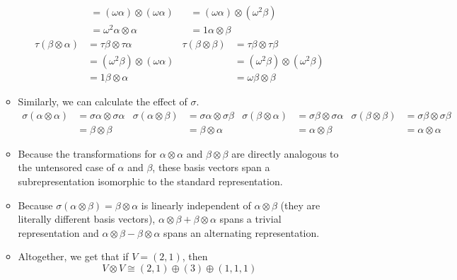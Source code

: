 \documentclass[../notes.tex]{subfiles}
\begin{document}
\begin{itemize}
\begin{itemize}
\begin{align*}
            &= (\omega\alpha)\otimes(\omega\alpha)&
                &= (\omega\alpha)\otimes(\omega^2\beta)\\
            &= \omega^2\alpha\otimes\alpha&
                &= 1\alpha\otimes\beta
        \end{align*}
        \begin{align*}
            \tau(\beta\otimes\alpha) &= \tau\beta\otimes\tau\alpha&
                \tau(\beta\otimes\beta) &= \tau\beta\otimes\tau\beta\\
            &= (\omega^2\beta)\otimes(\omega\alpha)&
                &= (\omega^2\beta)\otimes(\omega^2\beta)\\
            &= 1\beta\otimes\alpha&
                &= \omega\beta\otimes\beta
        \end{align*}
        \item Similarly, we can calculate the effect of $\sigma$.
        \begin{align*}
            \sigma(\alpha\otimes\alpha) &= \sigma\alpha\otimes\sigma\alpha&
                \sigma(\alpha\otimes\beta) &= \sigma\alpha\otimes\sigma\beta&
                    \sigma(\beta\otimes\alpha) &= \sigma\beta\otimes\sigma\alpha&
                        \sigma(\beta\otimes\beta) &= \sigma\beta\otimes\sigma\beta\\
            &= \beta\otimes\beta&
                &= \beta\otimes\alpha&
                    &= \alpha\otimes\beta&
                        &= \alpha\otimes\alpha
        \end{align*}
        \item Because the transformations for $\alpha\otimes\alpha$ and $\beta\otimes\beta$ are directly analogous to the untensored case of $\alpha$ and $\beta$, these basis vectors span a subrepresentation isomorphic to the standard representation.
        \item Because $\sigma(\alpha\otimes\beta)=\beta\otimes\alpha$ is linearly independent of $\alpha\otimes\beta$ (they are literally different basis vectors), $\alpha\otimes\beta+\beta\otimes\alpha$ spans a trivial representation and $\alpha\otimes\beta-\beta\otimes\alpha$ spans an alternating representation.
        \item Altogether, we get that if $V=(2,1)$, then
        \begin{equation*}
            V\otimes V \cong (2,1)\oplus(3)\oplus(1,1,1)
        \end{equation*}
    \end{itemize}
\end{itemize}
\end{document}
